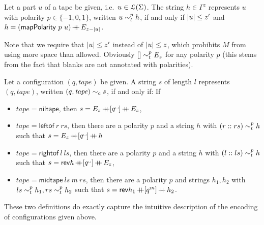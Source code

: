 \documentclass[a4paper,UKenglish,cleveref, autoref]{lipics-v2019}
\begin{document}
\begin{definition}
  Let a part $u$ of a tape be given, i.e.\ $u \in \mathcal{L} (\Sigma)$. The string $h \in \Gamma^{z}$ represents $u$ with polarity $p \in \{-1, 0, 1\}$, written $u \sim_t^{p} h$, if and only if $|u| \le z' $ and $h = (\textsf{mapPolarity}~p~u) \mathop{{+}\!\!\!{+}} E_{z-|u|}$.
\end{definition}

Note that we require that $|u| \le z'$ instead of $|u| \le z$, which prohibits $M$ from using more space than allowed. 
Obviously $[] \sim_t^{p} E_{z}$ for any polarity $p$ (this stems from the fact that blanks are not annotated with polarities).

\begin{definition}
  Let a configuration $(q, \mathit{tape})$ be given. A string $s$ of length $l$ represents $(q, \mathit{tape})$, written $(q, \mathit{tape}) \sim_c s$, if and only if: If
  \begin{itemize}
    \item $\mathit{tape} = \textsf{niltape}$, then $s =  E_z \concat [q^\blank] \concat E_z$, 
    \item $\mathit{tape} = \textsf{leftof}~r~rs$, then there are a polarity $p$ and a string $h$ with $(r :: rs) \sim_t^{p} h$ such that $s = E_z \concat [q^\blank] \concat h$
    \item $\mathit{tape} = \textsf{rightof}~l~ls$, then there are a polarity $p$ and a string $h$ with $(l::ls) \sim_t^{p} h$ such that $s = \rev{h} \concat [q^\blank] \concat E_z$, 
    \item $\mathit{tape} = \textsf{midtape}~ls~m~rs$, then there are a polarity $p$ and strings $h_1, h_2$ with $ls \sim_t^{p} h_1, rs \sim_t^{p} h_2$ such that $s = \mathsf{rev}{h_1} \mathop{{+}\!\!\!{+}} [q^m] \mathop{{+}\!\!\!{+}} h_2$. 
  \end{itemize}
\end{definition}

These two definitions do exactly capture the intuitive description of the encoding of configurations given above. 
\end{document}
